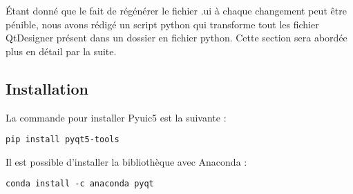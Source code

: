 Étant donné que le fait de régénérer le fichier .ui à chaque changement peut être pénible, nous avons rédigé un script python qui transforme tout les fichier QtDesigner présent dans un dossier en fichier python. \newline
Cette section sera abordée plus en détail par la suite.

\subsection{Installation}

La commande pour installer Pyuic5 est la suivante : \newline

\begin{lstlisting}
pip install pyqt5-tools
\end{lstlisting}
Il est possible d'installer la bibliothèque avec Anaconda : \newline
\begin{lstlisting}
conda install -c anaconda pyqt
\end{lstlisting}



